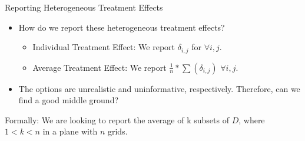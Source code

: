 \begin{frame}{Reporting Heterogeneous Treatment Effects}
\begin{itemize}
    \item How do we report these heterogeneous treatment effects?
    \vspace{-7pt}
\begin{itemize}
    \item Individual Treatment Effect: We report $\delta_{i,j}$ for $\forall i,j$.
    \item Average Treatment Effect: We report $\frac{1}{n}*\sum(\delta_{i,j})$ $\forall i,j$. 
\end{itemize}
    \vspace{-7pt}
    \item The options are unrealistic and uninformative, respectively. Therefore, can we find a good middle ground?
\end{itemize}

\begin{center}
    Formally: We are looking to report the average of k subsets of $D$, where $1 < k < n$ in a plane with $n$ grids. 
\end{center}
\end{frame}

